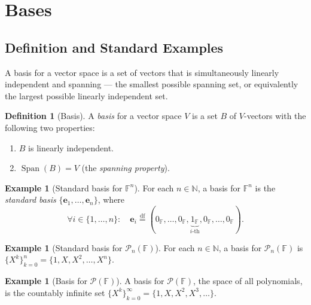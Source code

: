 \documentclass[11pt, a4paper, notitlepage]{report}
\theoremstyle{definition}
\newtheorem{definition}[theorem]{Definition}
\newtheorem{example}[theorem]{Example}
\theoremstyle{remark}
\begin{document}
\section{Bases}
\label{sec:bases}

\subsection{Definition and Standard Examples}

A basis for a vector space is a set of vectors that is simultaneously linearly independent and spanning — the smallest possible spanning set, or equivalently the largest possible linearly independent set.

\begin{definition}[Basis]\label{def:basis}
A \emph{basis} for a vector space $V$ is a set $B$ of $V$-vectors with the following two properties:
\begin{enumerate}
  \item $B$ is linearly independent.
  \item $\operatorname{Span}(B) = V$ \quad (the \emph{spanning property}).
\end{enumerate}
\end{definition}

\begin{example}[Standard basis for $\mathbb{F}^n$]\label{ex:standard-basis-Fn}
For each $n\in\mathbb{N}$, a basis for $\mathbb{F}^n$ is the \emph{standard basis} $\{\mathbf{e}_1, \ldots, \mathbf{e}_n\}$, where
\[
  \forall i\in\{1,\ldots,n\}:\quad
  \mathbf{e}_i \stackrel{\mathrm{df}}{=} (0_\mathbb{F}, \ldots, 0_\mathbb{F}, \underbrace{1_\mathbb{F}}_{i\text{-th}}, 0_\mathbb{F}, \ldots, 0_\mathbb{F}).
\]
\end{example}

\begin{example}[Standard basis for $\mathscr{P}_n(\mathbb{F})$]\label{ex:standard-basis-Pn}
For each $n\in\mathbb{N}$, a basis for $\mathscr{P}_n(\mathbb{F})$ is $\{X^k\}_{k=0}^n = \{1, X, X^2, \ldots, X^n\}$.
\end{example}

\begin{example}[Basis for $\mathscr{P}(\mathbb{F})$]\label{ex:standard-basis-P}
A basis for $\mathscr{P}(\mathbb{F})$, the space of all polynomials, is the countably infinite set $\{X^k\}_{k=0}^\infty = \{1, X, X^2, X^3, \ldots\}$.
\end{example}
\end{document}
